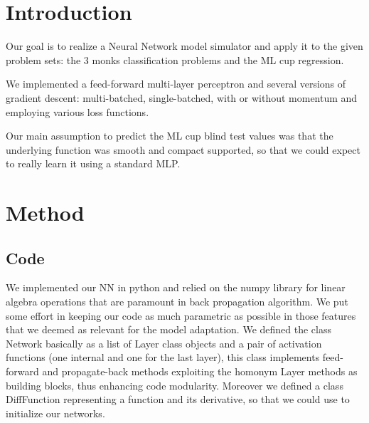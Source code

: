 \section{Introduction}
Our goal is to realize a Neural Network model simulator and apply it to the given problem sets: the 3 monks classification problems and the ML cup regression.

We implemented a feed-forward multi-layer perceptron and several versions of gradient descent: multi-batched, single-batched, with or without momentum and employing various loss functions.

Our main assumption to predict the ML cup blind test values was that the underlying function was smooth and compact supported, so that we could expect to really learn it using a standard MLP. 

\section{Method}
\subsection{Code}
We implemented our NN in python and relied on the numpy library for linear algebra operations that are paramount in back propagation algorithm. We put some effort in keeping our code as much parametric as possible in those features that we deemed as relevant for the model adaptation. We defined the class Network basically as a list of Layer class objects and a pair of activation functions (one internal and one for the last layer), this class implements feed-forward and propagate-back methods exploiting the homonym Layer methods as building blocks, thus enhancing code modularity. Moreover we defined a class DiffFunction representing a function and its derivative, so that we could use to initialize our networks.




